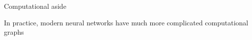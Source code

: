 \begin{frame}[t]{Computational aside}

	In practice, modern neural networks have much more complicated computational graphs

	\pause


\end{frame}

